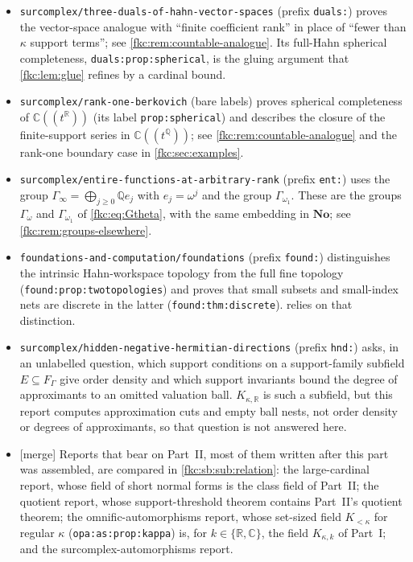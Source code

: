 \documentclass[11pt,letterpaper]{article}
\numberwithin{equation}{section}
\theoremstyle{definition}
\theoremstyle{remark}
\newcommand{\R}{\mathbb R}
\newcommand{\C}{\mathbb C}
\newcommand{\Q}{\mathbb Q}
\newcommand{\No}{\mathbf{No}}
\newcommand{\K}{K_{\kappa,k}}
\newcommand{\mergetag}{\textup{\textsf{\small[merge]}}}%
\begin{document}
\begin{itemize}
\item \texttt{surcomplex/three-duals-of-hahn-vector-spaces} (prefix \texttt{duals:}) \cite{CollDuals} proves the vector-space analogue with ``finite coefficient rank'' in place of ``fewer than $\kappa$ support terms''; see \cref{fkc:rem:countable-analogue}. Its full-Hahn spherical completeness, \texttt{duals:prop:spherical}, is the gluing argument that \cref{fkc:lem:glue} refines by a cardinal bound.
\item \texttt{surcomplex/rank-one-berkovich} (bare labels) \cite{CollBerk} proves spherical completeness of $\C((t^\R))$ (its label \texttt{prop:spherical}) and describes the closure of the finite-support series in $\C((t^\Q))$; see \cref{fkc:rem:countable-analogue} and the rank-one boundary case in \cref{fkc:sec:examples}.
\item \texttt{surcomplex/entire-functions-at-arbitrary-rank} (prefix \texttt{ent:}) \cite{CollEnt} uses the group $\Gamma_\infty=\bigoplus_{j\ge0}\Q e_j$ with $e_j=\omega^j$ and the group $\Gamma_{\omega_1}$. These are the groups $\Gamma_\omega$ and $\Gamma_{\omega_1}$ of \eqref{fkc:eq:Gtheta}, with the same embedding in $\No$; see \cref{fkc:rem:groups-elsewhere}.
\item \texttt{foundations-and-computation/foundations} (prefix \texttt{found:}) \cite{CollFound} distinguishes the intrinsic Hahn-workspace topology from the full fine topology (\texttt{found:prop:twotopologies}) and proves that small subsets and small-index nets are discrete in the latter (\texttt{found:thm:discrete}).  relies on that distinction.
\item \texttt{surcomplex/hidden-negative-hermitian-directions} (prefix \texttt{hnd:}) \cite{CollHND} asks, in an unlabelled question, which support conditions on a support-family subfield $E\subseteq F_\Gamma$ give order density and which support invariants bound the degree of approximants to an omitted valuation ball. $K_{\kappa,\R}$ is such a subfield, but this report computes approximation cuts and empty ball nests, not order density or degrees of approximants, so that question is not answered here.
\item \mergetag{} Reports that bear on Part~II, most of them written after this part was assembled, are compared in \cref{fkc:sb:sub:relation}: the large-cardinal report, whose field of short normal forms is the class field of Part~II; the quotient report, whose support-threshold theorem contains Part~II's quotient theorem; the omnific-automorphisms report, whose set-sized field $K_{<\kappa}$ for regular $\kappa$ (\texttt{opa:as:prop:kappa}) is, for $k\in\{\R,\C\}$, the field $\K$ of Part~I; and the surcomplex-automorphisms report.
\end{itemize}
\end{document}
